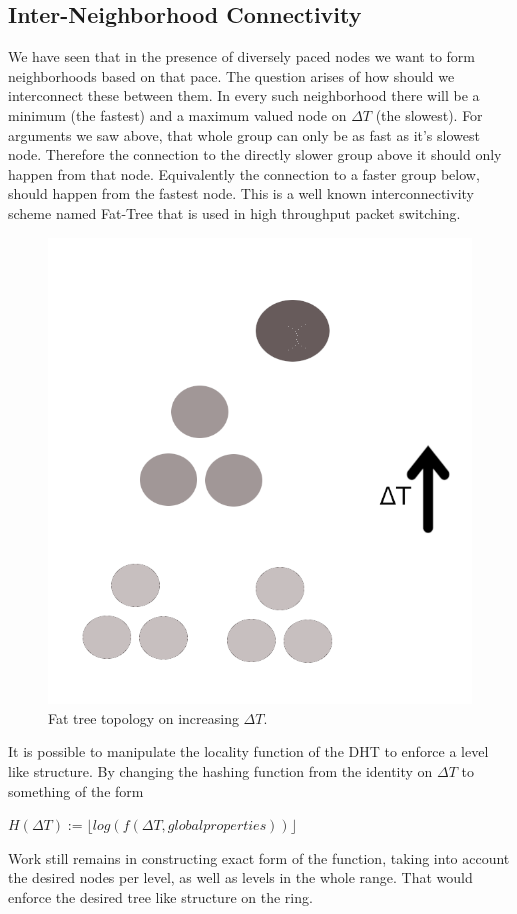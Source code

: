 \documentclass[12pt,notitlepage]{article}
\newcommand{\mfloor}[1]{\lfloor #1 \rfloor}
\begin{document}
\subsection{Inter-Neighborhood Connectivity}
We have seen that in the presence of diversely paced nodes we want to form 
neighborhoods based on that pace. The question arises of how should we 
interconnect these between them. In every such neighborhood there will be
a minimum (the fastest) and a maximum valued node on $\Delta T$ (the slowest).
For arguments we saw above, that whole group can only be as fast as it's
slowest node. Therefore the connection to the directly slower group above it
should only happen from that node. Equivalently the connection to a faster 
group below, should happen from the fastest node. This is a well known
interconnectivity scheme named Fat-Tree \cite{fat-trees} that is used in 
high throughput packet switching.
\begin{figure}[h]
\begin{center}
\includegraphics[scale=0.17]{img/fig2.png}
\end{center}
\caption{Fat tree topology on increasing $\Delta T$.}
\end{figure}

It is possible to manipulate the locality function of the DHT to enforce a
level like structure. By changing the hashing function  from the identity on
 $\Delta T$ to something of the form
\begin{center}
\begin{math}
H(\Delta T) := \mfloor{log(f(\Delta T, global properties))}
\end{math}
\end{center}
Work still remains in constructing exact form of the function, taking into account the
desired nodes per level, as well as levels in the whole range.
That would enforce the desired tree like structure on the ring.
\end{document}
